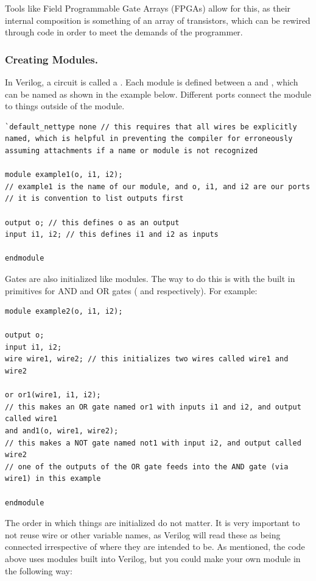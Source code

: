Tools like Field Programmable Gate Arrays (FPGAs) allow for this, as their internal composition is something of an array of transistors, which can be rewired through code in order to meet the demands of the programmer. 


\subsubsection{Creating Modules.} In Verilog, a circuit is called a . Each module is defined between a  and , which can be named as shown in the example below. Different ports connect the module to things outside of the module.

\bs

\begin{lstlisting}
`default_nettype none // this requires that all wires be explicitly named, which is helpful in preventing the compiler for erroneously assuming attachments if a name or module is not recognized

module example1(o, i1, i2); 
// example1 is the name of our module, and o, i1, and i2 are our ports 
// it is convention to list outputs first

output o; // this defines o as an output
input i1, i2; // this defines i1 and i2 as inputs

endmodule
\end{lstlisting}

\bs

Gates are also initialized like modules. The way to do this is with the built in primitives for AND and OR gates ( and  respectively). For example: 

\bs

\begin{lstlisting}
module example2(o, i1, i2); 

output o; 
input i1, i2; 
wire wire1, wire2; // this initializes two wires called wire1 and wire2

or or1(wire1, i1, i2); 
// this makes an OR gate named or1 with inputs i1 and i2, and output called wire1
and and1(o, wire1, wire2);
// this makes a NOT gate named not1 with input i2, and output called wire2
// one of the outputs of the OR gate feeds into the AND gate (via wire1) in this example

endmodule
\end{lstlisting}

\bs

The order in which things are initialized do not matter. It is very important to not reuse wire or other variable names, as Verilog will read these as being connected irrespective of where they are intended to be. As mentioned, the code above uses modules built into Verilog, but you could make your own module in the following way: 

